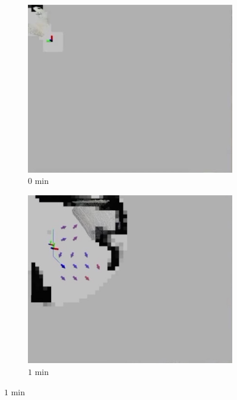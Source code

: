 \documentclass[smallextended]{svjour3}       %
\begin{document}
\begin{figure}[!t]
\centering
    	\begin{subfigure}[t]{0.44\columnwidth}
           	\centering
          	\includegraphics[width=\textwidth]{experiment_0min_2D.jpg}
        		\caption{$0$ min}
    	\end{subfigure}
    	\begin{subfigure}[t]{0.44\columnwidth}
           	\centering
          	\includegraphics[width=\textwidth]{experiment_1min_2D.jpg}
        		\caption{$1$ min}
    	\end{subfigure}

\end{figure}
\end{document}
